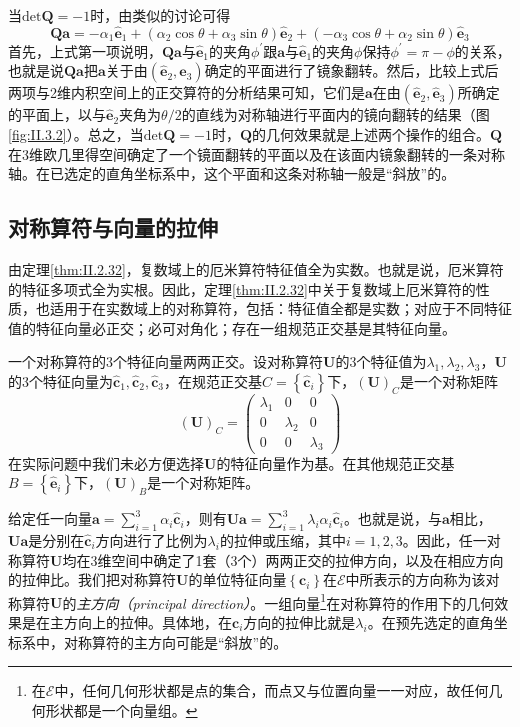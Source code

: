 \documentclass[main.tex]{subfiles}
\begin{document}
当$\mathrm{det}\mathbf{Q}=-1$时，由类似的讨论可得
\[\mathbf{Qa}=-\alpha_1\mathbf{\hat{e}}_1+\left(\alpha_2\cos\theta+\alpha_3\sin\theta\right)\mathbf{\hat{e}}_2+\left(-\alpha_3\cos\theta+\alpha_2\sin\theta\right)\mathbf{\hat{e}}_3\]
首先，上式第一项说明，$\mathbf{Qa}$与$\mathbf{\hat{e}}_1$的夹角$\phi^\prime$跟$\mathbf{a}$与$\mathbf{\hat{e}}_1$的夹角$\phi$保持$\phi^\prime=\pi-\phi$的关系，也就是说$\mathbf{Qa}$把$\mathbf{a}$关于由$\left(\mathbf{\hat{e}}_2,\mathbf{\hat{e}}_3\right)$确定的平面进行了镜象翻转。然后，比较上式后两项与2维内积空间上的正交算符的分析结果可知，它们是$\mathbf{a}$在由$\left(\mathbf{\hat{e}}_2,\mathbf{\hat{e}}_3\right)$所确定的平面上，以与$\mathbf{\hat{e}}_2$夹角为$\theta/2$的直线为对称轴进行平面内的镜向翻转的结果（图\ref{fig:II.3.2}）。总之，当$\mathrm{det}\mathbf{Q}=-1$时，$\mathbf{Q}$的几何效果就是上述两个操作的组合。$\mathbf{Q}$在3维欧几里得空间确定了一个镜面翻转的平面以及在该面内镜象翻转的一条对称轴。在已选定的直角坐标系中，这个平面和这条对称轴一般是“斜放”的。

\subsection{对称算符与向量的拉伸}
由定理\ref{thm:II.2.32}，复数域上的厄米算符特征值全为实数。也就是说，厄米算符的特征多项式全为实根。因此，定理\ref{thm:II.2.32}中关于复数域上厄米算符的性质，也适用于在实数域上的对称算符，包括：特征值全都是实数\cite[\S 5.3 定理3.4]{周胜林2012线性代数}；对应于不同特征值的特征向量必正交\cite[\S 5.3 定理3.5]{周胜林2012线性代数}；必可对角化\cite[\S 5.3 定理3.6]{周胜林2012线性代数}；存在一组规范正交基是其特征向量。

一个对称算符的3个特征向量两两正交。设对称算符$\mathbf{U}$的3个特征值为$\lambda_1,\lambda_2,\lambda_3$，$\mathbf{U}$的3个特征向量为$\mathbf{\hat{c}}_1,\mathbf{\hat{c}}_2,\mathbf{\hat{c}}_3$，在规范正交基$C=\left\{\mathbf{\hat{c}}_i\right\}$下，$\left(\mathbf{U}\right)_C$是一个对称矩阵
\[
    \left(\mathbf{U}\right)_C=\left(\begin{array}{ccc}\lambda_1&0&0\\0&\lambda_2&0\\0&0&\lambda_3\end{array}\right)
\]
在实际问题中我们未必方便选择$\mathbf{U}$的特征向量作为基。在其他规范正交基$B=\left\{\mathbf{\hat{e}}_i\right\}$下，$\left(\mathbf{U}\right)_B$是一个对称矩阵。

给定任一向量$\mathbf{a}=\sum_{i=1}^3\alpha_i\mathbf{\hat{c}}_i$，则有$\mathbf{Ua}=\sum_{i=1}^3\lambda_i\alpha_i\mathbf{\hat{c}}_i$。也就是说，与$\mathbf{a}$相比，$\mathbf{Ua}$是分别在$\mathbf{\hat{c}}_i$方向进行了比例为$\lambda_i$的拉伸或压缩，其中$i=1,2,3$。因此，任一对称算符$\mathbf{U}$均在3维空间中确定了1套（3个）两两正交的拉伸方向，以及在相应方向的拉伸比。我们把对称算符$\mathbf{U}$的单位特征向量$\left\{\mathbf{c}_i\right\}$在$\mathcal{E}$中所表示的方向称为该对称算符$\mathbf{U}$的\emph{主方向（principal direction）}。一组向量\footnote{在$\mathcal{E}$中，任何几何形状都是点的集合，而点又与位置向量一一对应，故任何几何形状都是一个向量组。}在对称算符的作用下的几何效果是在主方向上的拉伸。具体地，在$\mathbf{c}_i$方向的拉伸比就是$\lambda_i$。在预先选定的直角坐标系中，对称算符的主方向可能是“斜放”的。
\end{document}
